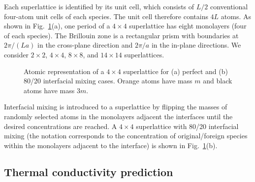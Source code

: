\documentclass[aps,prb,preprint,preprintnumbers,amsmath,amssymb,floatfix,superscriptaddress]{revtex4}
\begin{document}
Each superlattice is identified by its unit cell, which consists of $L/2$ conventional four-atom unit cells of each species. The unit cell therefore contains $4L$ atoms. As shown in Fig.~\ref{fig:md_domain}(a), one period of a $4\times4$ superlattice has eight monolayers (four of each species). The Brillouin zone is a rectangular prism with boundaries at $2\pi/(La)$ in the cross-plane direction and $2\pi/a$ in the in-plane directions. We consider $2\times2$, $4\times4$, $8\times8$, and $14\times14$ superlattices.
\begin{figure}[t!]
\begin{center}
\renewcommand{\figure}{Fig.}
\caption{Atomic representation of a $4\times4$ superlattice for (a) perfect and (b) 80/20 interfacial mixing cases. Orange atoms have mass  $m$ and black atoms have mass $3m$.}
\label{fig:md_domain}
\end{center}
\end{figure}

Interfacial mixing is introduced to a superlattice by flipping the masses of randomly selected atoms in the monolayers adjacent the interfaces until the desired concentrations are reached.\cite{PhysRevB.79.075316} A $4\times4$ superlattice with 80/20 interfacial mixing (the notation corresponds to the concentration of original/foreign species within the monolayers adjacent to the interface) is shown in Fig.~\ref{fig:md_domain}(b).

\subsection{Thermal conductivity prediction}\label{SEC:methods}
\end{document}
